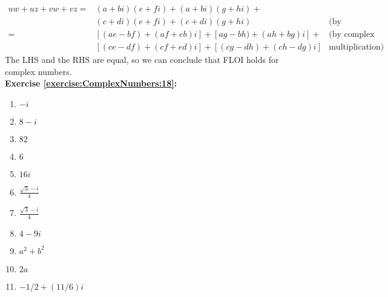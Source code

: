 \begin{align*}
uw + uz + vw + vz = &(a + bi)(e + fi) + (a + bi)(g + hi) +\\
&(c + di)(e + fi) + (c + di)(g + hi)&  \text{(by substitution)}& \\
= &[(ae - bf) + (af + eb)i] + [ag -bh) + (ah + bg)i] + & \text{(by complex }\\
&[(ce - df) + (cf + ed)i] + [(cg - dh) + (ch - dg)i]& \text{multiplication)}
\end{align*}
The LHS and the RHS are equal, so we can conclude that FLOI holds for complex numbers.\\

\noindent\textbf{Exercise \ref{exercise:ComplexNumbers:18}:}%
\begin{multicols}{2}
\begin{enumerate}[a]
\item $-i$

\item $8-i$

\item $82$

\item $6$

\item $16i$

\item $\displaystyle\frac{\sqrt{3}-i}{4}$

\item $\displaystyle\frac{\sqrt{3}-i}{4}$

\item $4-9i$

\item $a^{2}+b^{2}$

\item $2a$

\item $-1/2 + (11/6)i$

\end{enumerate}
\end{multicols}

